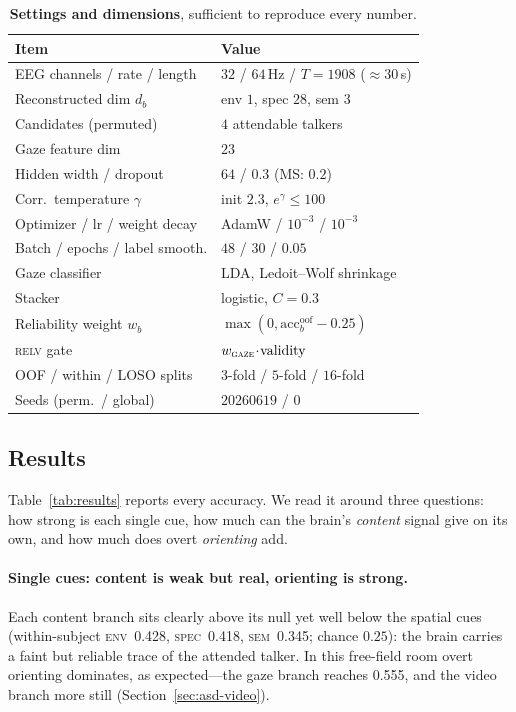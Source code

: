 \documentclass[10pt,twocolumn]{article}
\newcommand{\intraEnv}{0.428}\newcommand{\intraEnvS}{0.095}
\newcommand{\intraSpec}{0.418}\newcommand{\intraSpecS}{0.077}
\newcommand{\intraSem}{0.345}\newcommand{\intraSemS}{0.096}
\newcommand{\intraDirLda}{0.555}\newcommand{\intraDirLdaS}{0.231}
\begin{document}
\begin{table}[H]
\centering
\caption{\textbf{Settings and dimensions}, sufficient to reproduce every number.}
\label{tab:hp}
\small
\begin{tabular}{@{}ll@{}}
\toprule
Item & Value \\
\midrule
EEG channels / rate / length & $32$ / $64$\,Hz / $T{=}1908$ ($\approx\!30$\,s) \\
Reconstructed dim $d_b$ & env $1$, spec $28$, sem $3$ \\
Candidates (permuted) & $4$ attendable talkers \\
Gaze feature dim & $23$ \\
Hidden width / dropout & $64$ / $0.3$ (MS: $0.2$) \\
Corr.\ temperature $\gamma$ & init $2.3$, $e^{\gamma}\!\le\!100$ \\
Optimizer / lr / weight decay & AdamW / $10^{-3}$ / $10^{-3}$ \\
Batch / epochs / label smooth. & $48$ / $30$ / $0.05$ \\
Gaze classifier & LDA, Ledoit--Wolf shrinkage \\
Stacker & logistic, $C{=}0.3$ \\
Reliability weight $w_b$ & $\max(0,\mathrm{acc}^{\mathrm{oof}}_b-0.25)$ \\
\textsc{relv} gate & $w_{\textsc{gaze}}\!\cdot\!\text{validity}$ \\
OOF / within / LOSO splits & $3$-fold / $5$-fold / $16$-fold \\
Seeds (perm.\ / global) & $20260619$ / $0$ \\
\bottomrule
\end{tabular}
\end{table}

\subsection{Results}
\label{sec:asd-results}

Table~\ref{tab:results} reports every accuracy. We read it around three questions:
how strong is each single cue, how much can the brain's \emph{content} signal give
on its own, and how much does overt \emph{orienting} add.

\paragraph{Single cues: content is weak but real, orienting is strong.}
Each content branch sits clearly above its null yet well below the spatial cues
(within-subject \textsc{env}~\intraEnv, \textsc{spec}~\intraSpec,
\textsc{sem}~\intraSem; chance $0.25$): the brain carries a faint but reliable
trace of the attended talker. In this free-field room overt orienting dominates,
as expected---the gaze branch reaches \intraDirLda, and the video branch more
still (Section~\ref{sec:asd-video}).
\end{document}
